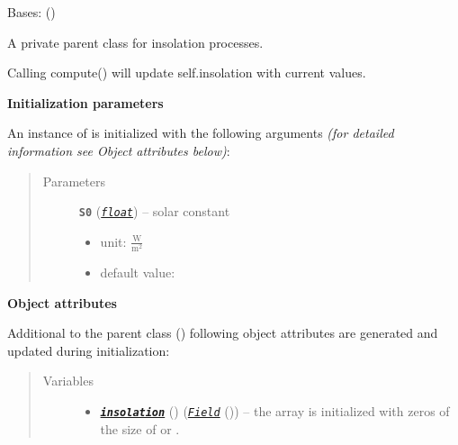 \documentclass[a4paper,10pt,english]{sphinxmanual}
\begin{document}
\begin{fulllineitems}
\label{api/climlab.radiation:climlab.radiation.insolation._Insolation}
Bases: {\hyperref[api/climlab.process:climlab.process.diagnostic.DiagnosticProcess]{\emph{}}} ()

A private parent class for insolation processes.

Calling compute() will update self.insolation with current values.

\textbf{Initialization parameters}

An instance of  is initialized with the following 
arguments \emph{(for detailed information see Object attributes below)}:
\begin{quote}\begin{description}
\item[{Parameters}] \leavevmode
\textbf{\texttt{S0}} (\href{http://docs.python.org/2.7/library/functions.html\#float}{\emph{\texttt{float}}}) -- 
solar constant
\begin{itemize}
\item {} 
unit: \(\frac{\textrm{W}}{\textrm{m}^2}\)

\item {} 
default value: 

\end{itemize}


\end{description}\end{quote}

\textbf{Object attributes}

Additional to the parent class {\hyperref[api/climlab.process:climlab.process.diagnostic.DiagnosticProcess]{\emph{}}} ()
following object attributes are generated and updated during initialization:
\begin{quote}\begin{description}
\item[{Variables}] \leavevmode\begin{itemize}
\item {} 
{\hyperref[api/climlab.radiation:climlab.radiation.insolation.P2Insolation.insolation]{\emph{\textbf{\texttt{insolation}}}}} () ({\hyperref[api/climlab.domain:climlab.domain.field.Field]{\emph{\emph{\texttt{Field}}}}} ()) -- the array is initialized with zeros of the size of
 or .


\end{itemize}
\end{description}
\end{quote}
\end{fulllineitems}
\end{document}

